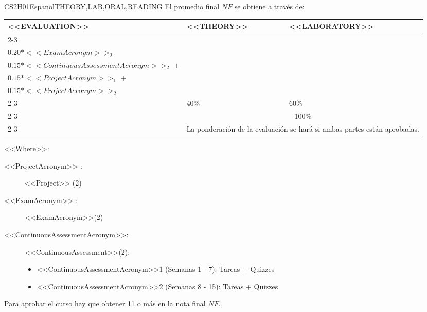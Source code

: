     \begin{evaluation}{CS2H01}{Espanol}{THEORY,LAB,ORAL,READING}
    El promedio final $NF$ se obtiene a través de:
   
    \begin{tabularx}{0.9\textwidth}{|X|p{}|p{}|} \hline
    \multirow{4}{*}{\uppercase{<<Evaluation>>}} & \uppercase{<<Theory>>} & \uppercase{<<Laboratory>>} \\ \cline{2-3}
    & %
        \begin{minipage}{0.95\textwidth}
        \begin{tabular}{l}
            $0.20*<<ExamAcronym>>_{1}$  + \\
            $0.20*<<ExamAcronym>>_{2}$  
        \end{tabular} 
        \end{minipage} 
    & %
        \begin{minipage}{0.95\textwidth}
        \begin{tabular}{l}
            $0.15*<<ContinuousAssessmentAcronym>>_{1}$  + \\
            $0.15*<<ContinuousAssessmentAcronym>>_{2}$  + \\
            $0.15*<<ProjectAcronym>>_{1}$  + \\
            $0.15*<<ProjectAcronym>>_{2}$ 
        \end{tabular} 
        \end{minipage}                 \\ \cline{2-3}
    
    & %
    40\% 
    & %
    60\% \\ \cline{2-3}
    & \multicolumn{2}{|c|}{100\%}  \\ \cline{2-3}
    & \multicolumn{2}{|c|}{La ponderación de la evaluación se hará si ambas partes están aprobadas.}  \\ \hline
    \end{tabularx}
      
    \vspace{2mm}
    \noindent <<Where>>:
    \begin{description}
        \item[<<ProjectAcronym>> :] <<Project>> (2)
        \item[<<ExamAcronym>> :] <<ExamAcronym>>(2)
        \item[<<ContinuousAssessmentAcronym>>:]<<ContinuousAssessment>>(2):
        \begin{itemize}
            \item <<ContinuousAssessmentAcronym>>1 (Semanas 1 - 7): Tareas + Quizzes
            \item <<ContinuousAssessmentAcronym>>2 (Semanas 8 - 15): Tareas + Quizzes
        \end{itemize}
    \end{description}
    
    \noindent Para aprobar el curso hay que obtener 11 o más en la nota final $NF$.
    \end{evaluation}
   
